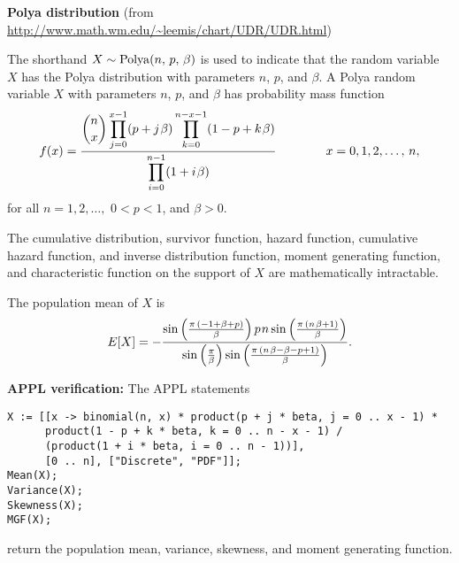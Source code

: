 \documentclass[12pt,fullpage]{article}
\begin{document}
\noindent
{\bf Polya distribution} (from \color{blue}\url{http://www.math.wm.edu/~leemis/chart/UDR/UDR.html}\color{black})

\noindent
The shorthand $X \sim {\rm Polya}(n,\, p,\, \beta)$ is used to indicate that the
random variable $X$ has the Polya distribution with parameters $n$, $p$, and $\beta$.
A Polya random variable $X$ with parameters $n$, $p$, and $\beta$ has probability mass function 
$$
f(x) =  \frac{\displaystyle {n \choose x} \prod_{j = 0} ^ {x - 1}(p + j \kern 0.08 em \beta) \displaystyle\prod_{k = 0} ^ {n - x - 1}(1 - p + k \kern 0.08 em \beta)}
{\displaystyle \prod_{i = 0} ^ {n - 1} (1 + i \kern 0.08 em \beta)}
 \qquad \qquad x = 0, 1, 2,  \ldots, \, n,
$$
for all $n=1, 2, \ldots,$ $0<p<1$, and $\beta>0$.

\vspace{0.05in}

\noindent
The cumulative distribution, survivor function, hazard function, cumulative hazard 
function, and inverse distribution function, moment generating function, and characteristic function
on the support of $X$ are mathematically intractable.

\vspace{0.05in}

\noindent
The population mean of $X$ is
$$
E[X] = -\frac{\sin \left( {\frac {\pi \, \left( -1 + \beta + p \right) }{\beta}}
 \right) p \kern 0.08 em n \sin \left( {\frac {\pi \, \left( n \kern 0.08 em \beta + 1 \right) }{\beta}
} \right)}{\sin \left( {\frac {\pi } {\beta}} \right)\sin \left( {\frac {\pi \, \left( n \kern 0.08 em \beta - \beta - p + 1
 \right) } {\beta}} \right)}.
$$
\vspace{0.1in}

\noindent
{\bf APPL verification:}
The APPL statements
\begin{verbatim}
X := [[x -> binomial(n, x) * product(p + j * beta, j = 0 .. x - 1) *
      product(1 - p + k * beta, k = 0 .. n - x - 1) /
      (product(1 + i * beta, i = 0 .. n - 1))],  
      [0 .. n], ["Discrete", "PDF"]];
Mean(X);
Variance(X);
Skewness(X);
MGF(X);
\end{verbatim}
return the population mean, variance, skewness, and moment generating function.
\end{document}
